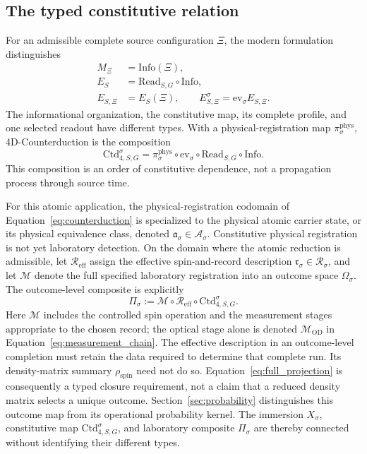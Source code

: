 \documentclass[11pt,a4paper]{article}
\theoremstyle{definition}
\theoremstyle{remark}
\begin{document}
\subsection{The typed constitutive relation}
For an admissible complete source configuration $\Xi$, the modern formulation distinguishes
\begin{align}
 M_\Xi&=\mathrm{Info}(\Xi),\nonumber\\
 E_S&=\mathrm{Read}_{S,G}\circ\mathrm{Info},\nonumber\\
 E_{S,\Xi}&=E_S(\Xi),\qquad
 E^\sigma_{S,\Xi}=\mathrm{ev}_\sigma E_{S,\Xi}.
 \label{eq:ecl}
\end{align}
The informational organization, the constitutive map, its complete profile, and one selected readout have different types. With a physical-registration map $\pi^{\mathrm{phys}}_\sigma$, 4D-Counterduction is the composition
\begin{equation}
 \mathrm{Ctd}^{\sigma}_{4,S,G}
 =\pi^{\mathrm{phys}}_\sigma\circ\mathrm{ev}_\sigma
   \circ\mathrm{Read}_{S,G}\circ\mathrm{Info}.
 \label{eq:counterduction}
\end{equation}
This composition is an order of constitutive dependence, not a propagation process through source time.\cite{foundation}

For this atomic application, the physical-registration codomain of Equation~\eqref{eq:counterduction} is specialized to the physical atomic carrier state, or its physical equivalence class, denoted $\mathfrak a_\sigma\in\mathcal A_\sigma$. Constitutive physical registration is not yet laboratory detection. On the domain where the atomic reduction is admissible, let $\mathcal R_{\mathrm{eff}}$ assign the effective spin-and-record description $\mathfrak r_\sigma\in\mathcal R_\sigma$, and let $\mathcal M$ denote the full specified laboratory registration into an outcome space $\Omega_\sigma$. The outcome-level composite is explicitly
\begin{equation}
 \Pi_\sigma:=\mathcal M\circ\mathcal R_{\mathrm{eff}}
                 \circ\mathrm{Ctd}^{\sigma}_{4,S,G}.
 \label{eq:full_projection}
\end{equation}
Here $\mathcal M$ includes the controlled spin operation and the measurement stages appropriate to the chosen record; the optical stage alone is denoted $\mathcal M_{\mathrm{OD}}$ in Equation~\eqref{eq:measurement_chain}. The effective description in an outcome-level completion must retain the data required to determine that complete run. Its density-matrix summary $\rho_{\mathrm{spin}}$ need not do so. Equation~\eqref{eq:full_projection} is consequently a typed closure requirement, not a claim that a reduced density matrix selects a unique outcome. Section~\ref{sec:probability} distinguishes this outcome map from its operational probability kernel. The immersion $X_\sigma$, constitutive map $\mathrm{Ctd}^{\sigma}_{4,S,G}$, and laboratory composite $\Pi_\sigma$ are thereby connected without identifying their different types.\cite{foundation,born}
\end{document}
